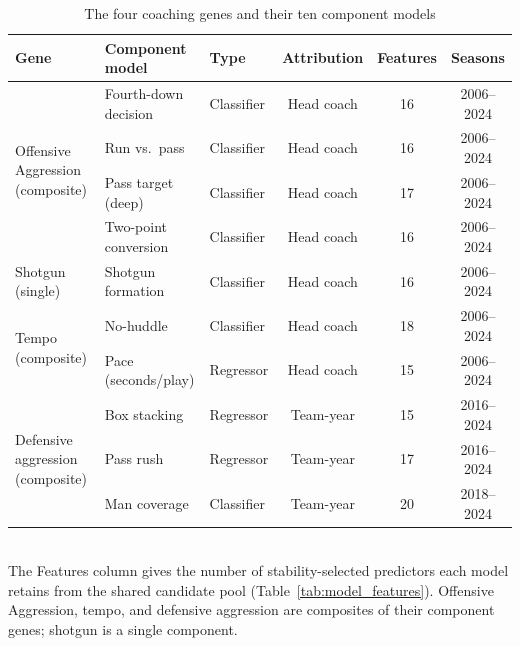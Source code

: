 \documentclass[USenglish]{article}
\theoremstyle{dgthm}
\theoremstyle{dgdef}
\begin{document}
\begin{table}[H]
\caption{The four coaching genes and their ten component models}
\label{tab:gene_architecture}
\scriptsize
\begin{tabular}{lllccc}
\toprule
\textbf{Gene} & \textbf{Component model} & \textbf{Type} & \textbf{Attribution} & \textbf{Features} & \textbf{Seasons} \\
\midrule
\multirow{4}{*}{Offensive Aggression (composite)} & Fourth-down decision & Classifier & Head coach & 16 & 2006--2024 \\
 & Run vs.\ pass & Classifier & Head coach & 16 & 2006--2024 \\
 & Pass target (deep) & Classifier & Head coach & 17 & 2006--2024 \\
 & Two-point conversion & Classifier & Head coach & 16 & 2006--2024 \\
\midrule
Shotgun (single) & Shotgun formation & Classifier & Head coach & 16 & 2006--2024 \\
\midrule
\multirow{2}{*}{Tempo (composite)} & No-huddle & Classifier & Head coach & 18 & 2006--2024 \\
 & Pace (seconds/play) & Regressor & Head coach & 15 & 2006--2024 \\
\midrule
\multirow{3}{*}{Defensive aggression (composite)} & Box stacking & Regressor & Team-year & 15 & 2016--2024 \\
 & Pass rush & Regressor & Team-year & 17 & 2016--2024 \\
 & Man coverage & Classifier & Team-year & 20 & 2018--2024 \\
\bottomrule
\end{tabular}
\\[2pt]
{\scriptsize The Features column gives the number of stability-selected predictors each model retains from the shared candidate pool (Table~\ref{tab:model_features}). Offensive Aggression, tempo, and defensive aggression are composites of their component genes; shotgun is a single component.}
\end{table}
\end{document}
